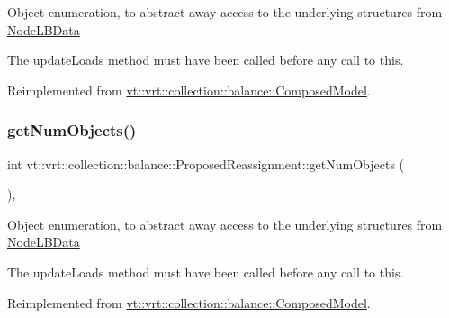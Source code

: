 Object enumeration, to abstract away access to the underlying structures from \hyperlink{structvt_1_1vrt_1_1collection_1_1balance_1_1_node_l_b_data}{Node\+L\+B\+Data}

The {\ttfamily update\+Loads} method must have been called before any call to this. 

Reimplemented from \hyperlink{classvt_1_1vrt_1_1collection_1_1balance_1_1_composed_model_a8f34205887c08a22a1e5bef6ee358f2b}{vt\+::vrt\+::collection\+::balance\+::\+Composed\+Model}.

\mbox{\label{structvt_1_1vrt_1_1collection_1_1balance_1_1_proposed_reassignment_ad265d4881094bb11cb538e7340bc8a49}} 
\subsubsection{\texorpdfstring{get\+Num\+Objects()}{getNumObjects()}}
{\footnotesize\ttfamily int vt\+::vrt\+::collection\+::balance\+::\+Proposed\+Reassignment\+::get\+Num\+Objects (\begin{DoxyParamCaption}{ }\end{DoxyParamCaption})\hspace{0.3cm}{\ttfamily [override]}, {\ttfamily [virtual]}}

Object enumeration, to abstract away access to the underlying structures from \hyperlink{structvt_1_1vrt_1_1collection_1_1balance_1_1_node_l_b_data}{Node\+L\+B\+Data}

The {\ttfamily update\+Loads} method must have been called before any call to this. 

Reimplemented from \hyperlink{classvt_1_1vrt_1_1collection_1_1balance_1_1_composed_model_a7b383954706cb8069e841a87c3ff3f8f}{vt\+::vrt\+::collection\+::balance\+::\+Composed\+Model}.

\mbox{\label{structvt_1_1vrt_1_1collection_1_1balance_1_1_proposed_reassignment_ac865e7afd9b830328a31b947aed65f05}} 
